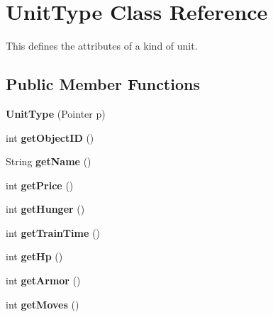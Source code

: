 \hypertarget{classUnitType}{
\section{UnitType Class Reference}
\label{classUnitType}
}
This defines the attributes of a kind of unit.  


\subsection*{Public Member Functions}
\begin{CompactItemize}
\item 
\hypertarget{classUnitType_66de1b1310ddbb5a976c9cc77d5ad278}{
\textbf{UnitType} (Pointer p)}
\label{classUnitType_66de1b1310ddbb5a976c9cc77d5ad278}

\item 
\hypertarget{classUnitType_637c95fba9e876ac8de83a70c95b3e66}{
int \textbf{getObjectID} ()}
\label{classUnitType_637c95fba9e876ac8de83a70c95b3e66}

\item 
\hypertarget{classUnitType_5c94f7e43728cd4a61858b32d6b030dd}{
String \textbf{getName} ()}
\label{classUnitType_5c94f7e43728cd4a61858b32d6b030dd}

\item 
\hypertarget{classUnitType_7ca0b7b89227e716315a7c76f7017fcd}{
int \textbf{getPrice} ()}
\label{classUnitType_7ca0b7b89227e716315a7c76f7017fcd}

\item 
\hypertarget{classUnitType_5e22ac3780dff1abdd3fa0ef837aaf8f}{
int \textbf{getHunger} ()}
\label{classUnitType_5e22ac3780dff1abdd3fa0ef837aaf8f}

\item 
\hypertarget{classUnitType_fcd1959ecca4be5257c193b527985853}{
int \textbf{getTrainTime} ()}
\label{classUnitType_fcd1959ecca4be5257c193b527985853}

\item 
\hypertarget{classUnitType_a8bf0827cfa82e97f2209eddad12d373}{
int \textbf{getHp} ()}
\label{classUnitType_a8bf0827cfa82e97f2209eddad12d373}

\item 
\hypertarget{classUnitType_8465e3d066463f694fdd7d6910e7f963}{
int \textbf{getArmor} ()}
\label{classUnitType_8465e3d066463f694fdd7d6910e7f963}

\item 
\hypertarget{classUnitType_d87e9706269f90b362c5214aeef749af}{
int \textbf{getMoves} ()}
\label{classUnitType_d87e9706269f90b362c5214aeef749af}


\end{CompactItemize}
